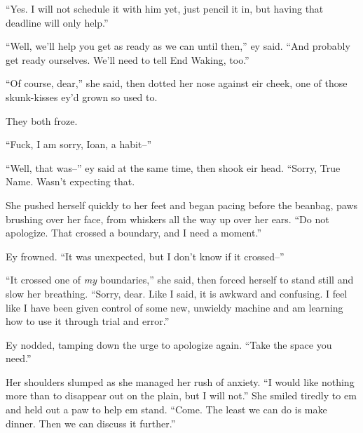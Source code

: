 ``Yes. I will not schedule it with him yet, just pencil it in, but having that deadline will only help.''

``Well, we'll help you get as ready as we can until then,'' ey said. ``And probably get ready ourselves. We'll need to tell End Waking, too.''

``Of course, dear,'' she said, then dotted her nose against eir cheek, one of those skunk-kisses ey'd grown so used to.

They both froze.

``Fuck, I am sorry, Ioan, a habit--''

``Well, that was--'' ey said at the same time, then shook eir head. ``Sorry, True Name. Wasn't expecting that.

She pushed herself quickly to her feet and began pacing before the beanbag, paws brushing over her face, from whiskers all the way up over her ears. ``Do not apologize. That crossed a boundary, and I need a moment.''

Ey frowned. ``It was unexpected, but I don't know if it crossed--''

``It crossed one of \emph{my} boundaries,'' she said, then forced herself to stand still and slow her breathing. ``Sorry, dear. Like I said, it is awkward and confusing. I feel like I have been given control of some new, unwieldy machine and am learning how to use it through trial and error.''

Ey nodded, tamping down the urge to apologize again. ``Take the space you need.''

Her shoulders slumped as she managed her rush of anxiety. ``I would like nothing more than to disappear out on the plain, but I will not.'' She smiled tiredly to em and held out a paw to help em stand. ``Come. The least we can do is make dinner. Then we can discuss it further.''
